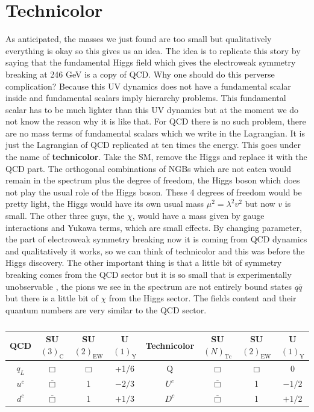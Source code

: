 \documentclass[../main.tex]{subfiles}
\begin{document}
\section{Technicolor}
As anticipated, the masses we just found are too small but qualitatively everything is okay so this gives us an idea. The idea is to replicate this story by saying that the fundamental Higgs field which gives the electroweak symmetry breaking at 246 GeV is a copy of QCD. Why one should do this perverse complication? Because this UV dynamics does not have a fundamental scalar inside and fundamental scalars imply hierarchy problems. This fundamental scalar has to be much lighter than this UV dynamics but at the moment we do not know the reason why it is like that. For QCD there is no such problem, there are no mass terms of fundamental scalars which we write in the Lagrangian. It is just the Lagrangian of QCD replicated at ten times the energy. This goes under the name of \textbf{technicolor}. Take the SM, remove the Higgs and replace it with the QCD part. The orthogonal combinations of NGBs which are not eaten would remain in the spectrum plus the  degree of freedom, the Higgs boson which does not play the usual role of the Higgs boson. These 4 degrees of freedom would be pretty light, the Higgs would have its own usual mass $\mu^2=\lambda^2v^2$ but now $v$ is small. The other three guys, the $\chi$, would have a mass given by gauge interactions and Yukawa terms, which are small effects. By changing parameter, the part of electroweak symmetry breaking now it is coming from QCD dynamics and qualitatively it works, so we can think of technicolor and this was before the Higgs discovery. The other important thing is that a little bit of symmetry breaking comes from the QCD sector but it is so small that is experimentally unobservable , the pions we see in the spectrum are not entirely bound states $q\overline{q}$ but there is a little bit of $\chi$ from the Higgs sector. The fields content and their quantum numbers are very similar to the QCD sector.
\begin{table}[h]
    \centering
    \begin{tabular}{c|ccc||c|ccc}
    \hline
    \rowcolor{gray!45} QCD & SU$(3)_{\text{C}}$ & SU$(2)_{\text{EW}}$ & U$(1)_{\text{Y}}$ & Technicolor & SU$(N)_{\text{Tc}}$ & SU$(2)_{\text{EW}}$ & U$(1)_{\text{Y}}$\\
    \hline 
    $q_L$ & $\Box$ & $\Box$ & +1/6 & Q & $\Box$ & $\Box$ & 0\\
    $u^c$ & $\overline{\Box}$ & 1 & $-2/3$ & $U^c$ & $\overline{\Box}$ & 1 & $-1/2$\\
    $d^c$ & $\overline{\Box}$ & 1 & $+1/3$ & $D^c$ & $\overline{\Box}$ & 1 & $+1/2$\\
    \hline
    \end{tabular}
    \caption*{}
\end{table}
\end{document}
